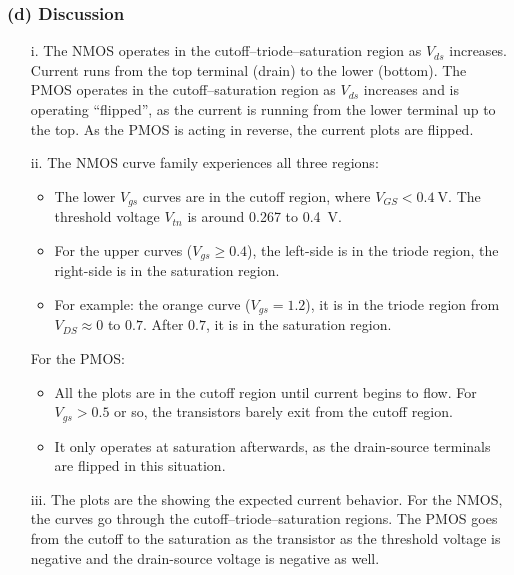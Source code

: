 \documentclass{homework}
\begin{document}
	\subsubsection*{(d) Discussion}
	\begin{enumerate}
		\item[i.] The NMOS operates in the cutoff--triode--saturation region as $V_{ds}$ increases. Current runs from the top terminal (drain) to the lower (bottom). The PMOS operates in the cutoff--saturation region as $V_{ds}$ increases and is operating ``flipped'', as the current is running from the lower terminal up to the top. As the PMOS is acting in reverse, the current plots are flipped.
		
		\item[ii.] The NMOS curve family experiences all three regions: \begin{itemize}
			\item The lower $V_{gs}$ curves are in the cutoff region, where $V_{GS} < \SI{0.4}{\V}$. The threshold voltage $V_{tn}$ is around \num{0.267} to \SI{0.4}{\V}.
			\item For the upper curves ($V_{gs} \ge 0.4$), the left-side is in the triode region, the right-side is in the saturation region.
			\item For example: the orange curve ($V_{gs} = 1.2$), it is in the triode region from $V_{DS} \approx 0$ to $0.7$. After $0.7$, it is in the saturation region.
		\end{itemize}
	
		For the PMOS: 
		
		\begin{itemize}
			\item All the plots are in the cutoff region until current begins to flow. For $V_{gs} > 0.5$ or so, the transistors barely exit from the cutoff region.
			\item It only operates at saturation afterwards, as the drain-source terminals are flipped in this situation. 
		\end{itemize}
		
		\item[iii.] The plots are the showing the expected current behavior. For the NMOS, the curves go through the cutoff--triode--saturation regions. The PMOS goes from the cutoff to the saturation as the transistor as the threshold voltage is negative and the drain-source voltage is negative as well.
		

\end{enumerate}
\end{document}
